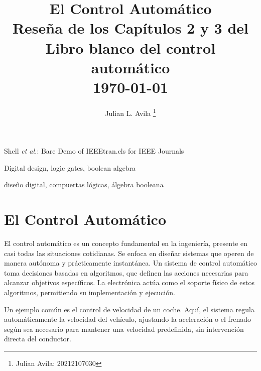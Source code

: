 \documentclass[journal, table]{IEEEtran}
\begin{document}
\title{\textbf{El Control Automático} \\
    \small{Reseña de los Capítulos 2 y 3 del Libro blanco del control automático
\cite{de-automatica-2009}} \\ \today}

\author[*]{Julian L. Avila
    \thanks{Julian Avila: 20212107030}}


\markboth{}
{Shell \MakeLowercase{\textit{et al.}}: Bare Demo of IEEEtran.cls for IEEE Journals}

\maketitle

\begin{abstract}
\end{abstract}

\begin{IEEEkeywords}
Digital design, logic gates, boolean algebra
\end{IEEEkeywords}

\begin{abstract}
\end{abstract}
\begin{IEEEkeywords}
diseño digital, compuertas lógicas, álgebra booleana
\end{IEEEkeywords}

\tableofcontents

\section{El Control Automático}%
\label{sec:El Control Automático}

El control automático es un concepto fundamental en la ingeniería, presente en
casi todas las situaciones cotidianas. Se enfoca en diseñar sistemas que operen
de manera autónoma y prácticamente instantánea. Un sistema de control automático
toma decisiones basadas en algoritmos, que definen las acciones necesarias para
alcanzar objetivos específicos.
La electrónica actúa como el soporte físico de estos algoritmos, permitiendo su
implementación y ejecución.

Un ejemplo común es el control de velocidad de un coche. Aquí, el sistema regula
automáticamente la velocidad del vehículo, ajustando la aceleración o el frenado
según sea necesario para mantener una velocidad predefinida, sin intervención
directa del conductor.
\end{document}
